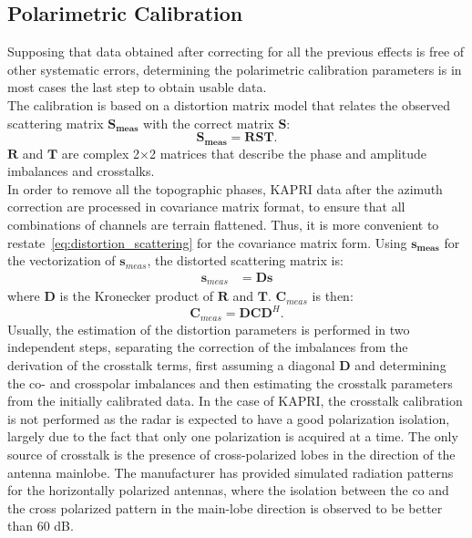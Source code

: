 \subsection{Polarimetric Calibration}
Supposing that data obtained after correcting for all the previous effects is free of other systematic errors, determining the polarimetric calibration parameters is in most cases the last step to obtain usable data.\\
The calibration is based on a distortion matrix model\cite{Saraband1990, Sarabandi1992a} that relates the observed scattering matrix $\mathbf{S_{meas}}$ with the correct matrix $\mathbf{S}$:
\begin{equation}\label{eq:distorsion_scattering}
	\mathbf{S_{meas}} = \mathbf{R} \mathbf{S} \mathbf{T}.
\end{equation}
$\mathbf{R}$ and $\mathbf{T}$ are complex 2$\times$2 matrices that describe the phase and amplitude imbalances and crosstalks.\\
In order to remove all the topographic phases, KAPRI data after the azimuth correction are processed in covariance matrix format, to ensure that all combinations of channels are terrain flattened. Thus, it is more convenient to restate~\autoref{eq:distortion_scattering} for the covariance matrix form. Using $\mathbf{s_{meas}}$ for the vectorization of $\mathbf{s}_{meas}$, the distorted scattering matrix is:
\begin{equation}
	\begin{aligned}
		\mathbf{s}_{meas} &= \mathbf{D} \mathbf{s} 
	\end{aligned}
\end{equation}
where $\mathbf{D}$ is the Kronecker product of $\mathbf{R}$ and $\mathbf{T}$.
$\mathbf{C}_{meas}$ is then:
\begin{equation}
	\mathbf{C}_{meas} = \mathbf{D} \mathbf{C} \mathbf{D}^{H}.
\end{equation}
Usually, the estimation of the distortion parameters is performed in two independent steps\cite{Fore2015}, separating the correction of the imbalances from the derivation of the crosstalk terms, first assuming a diagonal $\mathbf{D}$ and determining the co- and crosspolar imbalances and then estimating the crosstalk parameters from the initially calibrated data. In the case of KAPRI, the crosstalk calibration is not performed as the radar is expected to have a good polarization isolation, largely due to the fact that only one polarization is acquired at a time. The only source of crosstalk is the presence of cross-polarized lobes in the direction of the antenna mainlobe. The manufacturer has provided simulated radiation patterns for the horizontally polarized antennas, where the isolation between the co and the cross polarized pattern in the main-lobe direction is observed to be better than 60 dB.
